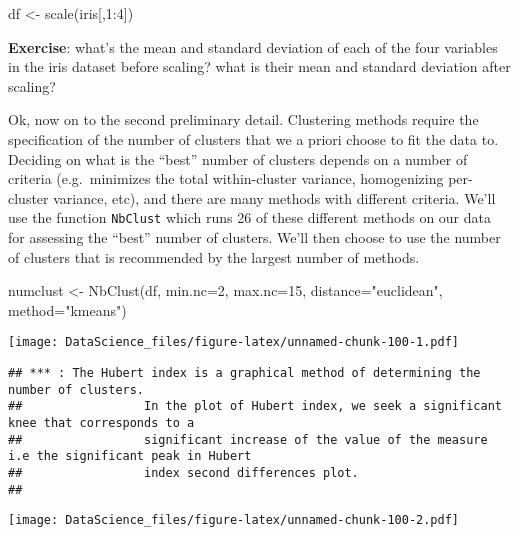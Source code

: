 \documentclass[
]{book}
\newenvironment{Shaded}{\begin{snugshade}}{\end{snugshade}}
\newcommand{\AttributeTok}[1]{\textcolor[rgb]{0.77,0.63,0.00}{#1}}
\newcommand{\DecValTok}[1]{\textcolor[rgb]{0.00,0.00,0.81}{#1}}
\newcommand{\FunctionTok}[1]{\textcolor[rgb]{0.00,0.00,0.00}{#1}}
\newcommand{\NormalTok}[1]{#1}
\newcommand{\OtherTok}[1]{\textcolor[rgb]{0.56,0.35,0.01}{#1}}
\newcommand{\SpecialCharTok}[1]{\textcolor[rgb]{0.00,0.00,0.00}{#1}}
\newcommand{\StringTok}[1]{\textcolor[rgb]{0.31,0.60,0.02}{#1}}
\begin{document}
\begin{Shaded}
\begin{Highlighting}[]
\NormalTok{df }\OtherTok{\textless{}{-}} \FunctionTok{scale}\NormalTok{(iris[,}\DecValTok{1}\SpecialCharTok{:}\DecValTok{4}\NormalTok{])}
\end{Highlighting}
\end{Shaded}

\textbf{Exercise}: what's the mean and standard deviation of each of the four variables in the iris dataset before scaling? what is their mean and standard deviation after scaling?

Ok, now on to the second preliminary detail. Clustering methods require the specification of the number of clusters that we a priori choose to fit the data to. Deciding on what is the ``best'' number of clusters depends on a number of criteria (e.g.~minimizes the total within-cluster variance, homogenizing per-cluster variance, etc), and there are many methods with different criteria. We'll use the function \texttt{NbClust} which runs 26 of these different methods on our data for assessing the ``best'' number of clusters. We'll then choose to use the number of clusters that is recommended by the largest number of methods.

\begin{Shaded}
\begin{Highlighting}[]
\NormalTok{numclust }\OtherTok{\textless{}{-}} \FunctionTok{NbClust}\NormalTok{(df, }\AttributeTok{min.nc=}\DecValTok{2}\NormalTok{, }\AttributeTok{max.nc=}\DecValTok{15}\NormalTok{, }\AttributeTok{distance=}\StringTok{"euclidean"}\NormalTok{, }\AttributeTok{method=}\StringTok{"kmeans"}\NormalTok{)}
\end{Highlighting}
\end{Shaded}

\texttt{[image: DataScience\_files/figure-latex/unnamed-chunk-100-1.pdf]}

\begin{verbatim}
## *** : The Hubert index is a graphical method of determining the number of clusters.
##                 In the plot of Hubert index, we seek a significant knee that corresponds to a 
##                 significant increase of the value of the measure i.e the significant peak in Hubert
##                 index second differences plot. 
## 
\end{verbatim}

\texttt{[image: DataScience\_files/figure-latex/unnamed-chunk-100-2.pdf]}
\end{document}
